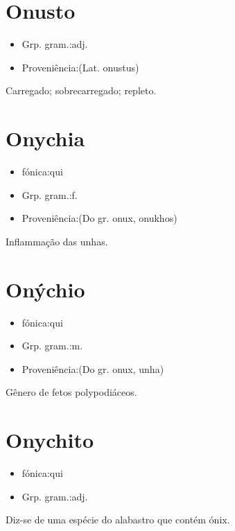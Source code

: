 \section{Onusto}
\begin{itemize}
\item {Grp. gram.:adj.}
\end{itemize}
\begin{itemize}
\item {Proveniência:(Lat. \textunderscore onustus\textunderscore )}
\end{itemize}
Carregado; sobrecarregado; repleto.
\section{Onychia}
\begin{itemize}
\item {fónica:qui}
\end{itemize}
\begin{itemize}
\item {Grp. gram.:f.}
\end{itemize}
\begin{itemize}
\item {Proveniência:(Do gr. \textunderscore onux\textunderscore , \textunderscore onukhos\textunderscore )}
\end{itemize}
Inflammação das unhas.
\section{Onýchio}
\begin{itemize}
\item {fónica:qui}
\end{itemize}
\begin{itemize}
\item {Grp. gram.:m.}
\end{itemize}
\begin{itemize}
\item {Proveniência:(Do gr. \textunderscore onux\textunderscore , unha)}
\end{itemize}
Gênero de fetos polypodiáceos.
\section{Onychito}
\begin{itemize}
\item {fónica:qui}
\end{itemize}
\begin{itemize}
\item {Grp. gram.:adj.}
\end{itemize}
Diz-se de uma espécie do alabastro que contém ónix.
